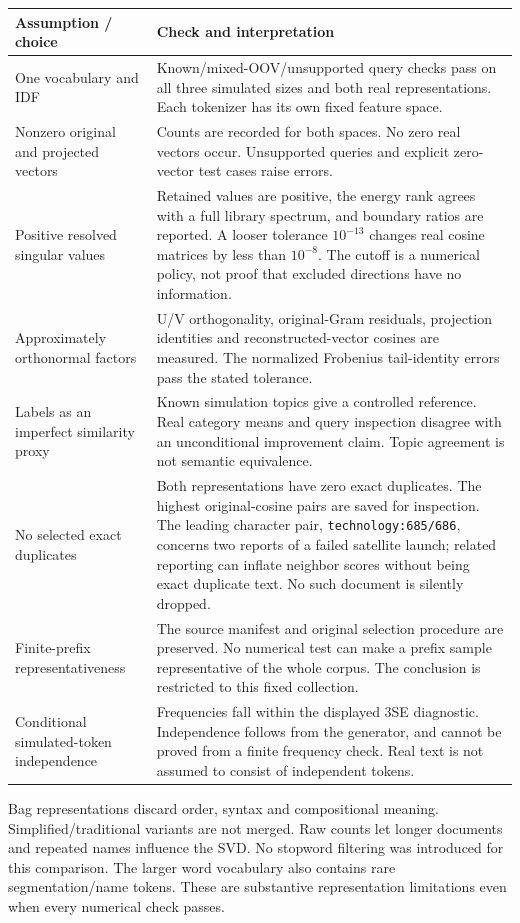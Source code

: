 \documentclass[11pt]{article}
\begin{document}
\begin{longtable}{p{}p{}}
\toprule Assumption / choice & Check and interpretation\\\midrule\endhead
One vocabulary and IDF & Known/mixed-OOV/unsupported query checks pass on all
three simulated sizes and both real representations. Each tokenizer has its
own fixed feature space.\\
Nonzero original and projected vectors & Counts are recorded for both spaces.
No zero real vectors occur. Unsupported queries and explicit zero-vector
test cases raise errors.\\
Positive resolved singular values & Retained values are positive, the energy
rank agrees with a full library spectrum, and boundary ratios are reported.
A looser tolerance $10^{-13}$ changes real cosine matrices by less than
$10^{-8}$. The cutoff is a numerical policy, not proof that excluded
directions have no information.\\
Approximately orthonormal factors & U/V orthogonality, original-Gram residuals,
projection identities and reconstructed-vector cosines are measured.
The normalized Frobenius tail-identity errors pass the stated tolerance.\\
Labels as an imperfect similarity proxy & Known simulation topics give a
controlled reference. Real category means and query inspection disagree
with an unconditional improvement claim. Topic agreement is not semantic
equivalence.\\
No selected exact duplicates & Both representations have zero exact duplicates.
The highest original-cosine pairs are saved for inspection. The leading
character pair, \texttt{technology:685/686}, concerns two reports of a
failed satellite launch; related reporting can inflate neighbor scores
without being exact duplicate text. No such document is silently dropped.\\
Finite-prefix representativeness & The source manifest and original selection
procedure are preserved. No numerical test can make a prefix sample
representative of the whole corpus. The conclusion is restricted to this
fixed collection.\\
Conditional simulated-token independence & Frequencies fall within the displayed
3SE diagnostic. Independence follows from the generator, and cannot be
proved from a finite frequency check. Real text is not assumed to consist
of independent tokens.\\
\bottomrule
\end{longtable}
Bag representations discard order, syntax and compositional meaning.
Simplified/traditional variants are not merged.
Raw counts let longer documents and repeated names influence the SVD.
No stopword filtering was introduced for this comparison.
The larger word vocabulary also contains rare segmentation/name tokens.
These are substantive representation limitations even when every
numerical check passes.
\end{document}
